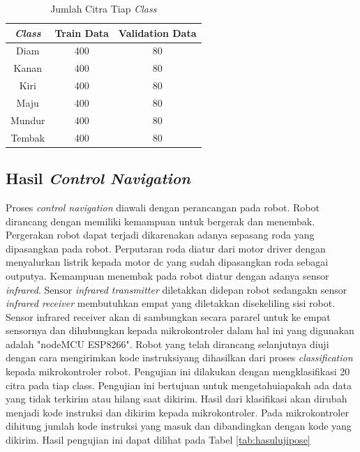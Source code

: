 \documentclass[conference]{IEEEtran}
\begin{document}
\begin{table}[H]
    \centering
    \caption{Jumlah Citra Tiap \emph{Class}}
    \label{tab:tiapclass}
    \begin{tabular}{|c|c|c|}
    \hline
    \emph{Class}  & Train Data & Validation Data \\ \hline
    Diam   & 400        & 80              \\ \hline
    Kanan  & 400        & 80              \\ \hline
    Kiri   & 400        & 80              \\ \hline
    Maju   & 400        & 80              \\ \hline
    Mundur & 400        & 80              \\ \hline
    Tembak & 400        & 80              \\ \hline
    \end{tabular}
  \end{table}

\subsection{Hasil \emph{Control Navigation}}
Proses \emph{control navigation} diawali dengan perancangan pada robot. Robot dirancang dengan memiliki kemampuan untuk bergerak dan menembak. Pergerakan robot dapat terjadi dikarenakan adanya sepasang roda yang dipasangkan pada robot. Perputaran roda diatur dari motor driver dengan menyalurkan listrik kepada motor dc yang sudah dipasangkan roda sebagai outputya. Kemampuan menembak pada robot diatur dengan adanya sensor \emph{infrared}. Sensor \emph{infrared transmitter} diletakkan didepan robot sedangakn sensor \emph{infrared receiver} membutuhkan empat yang diletakkan disekeliling sisi robot. Sensor infrared receiver akan di sambungkan secara pararel untuk ke empat sensornya dan dihubungkan kepada mikrokontroler dalam hal ini yang digunakan adalah "nodeMCU ESP8266". Robot yang telah dirancang selanjutnya diuji dengan cara mengirimkan kode instruksiyang dihasilkan dari proses \emph{classification} kepada mikrokontroler robot. Pengujian ini dilakukan dengan mengklasifikasi 20 citra pada tiap class. Pengujian ini bertujuan untuk mengetahuiapakah ada data yang tidak terkirim atau hilang saat dikirim. Hasil dari klasifikasi akan dirubah menjadi kode instruksi dan dikirim kepada mikrokontroler. Pada mikrokontroler dihitung jumlah kode instruksi yang masuk dan dibandingkan dengan kode yang dikirim. Hasil pengujian ini dapat dilihat pada Tabel \ref{tab:hasulujipose}
\end{document}
